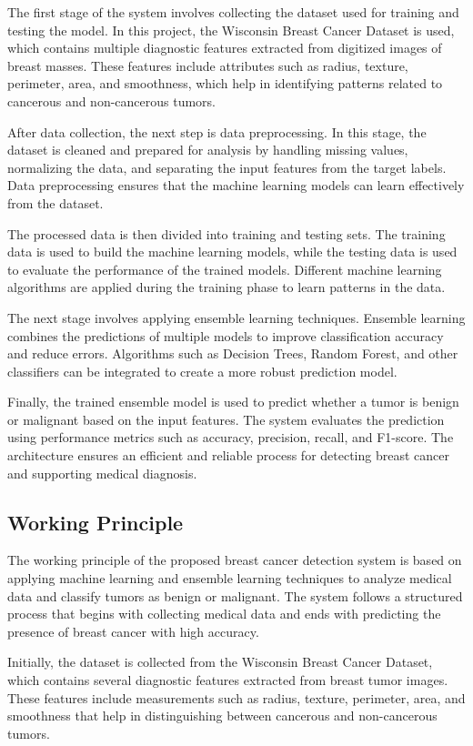\documentclass[12pt]{article}
\begin{document}
The first stage of the system involves collecting the dataset used for training and testing the model. In this project, the Wisconsin Breast Cancer Dataset is used, which contains multiple diagnostic features extracted from digitized images of breast masses. These features include attributes such as radius, texture, perimeter, area, and smoothness, which help in identifying patterns related to cancerous and non-cancerous tumors.

After data collection, the next step is data preprocessing. In this stage, the dataset is cleaned and prepared for analysis by handling missing values, normalizing the data, and separating the input features from the target labels. Data preprocessing ensures that the machine learning models can learn effectively from the dataset.

The processed data is then divided into training and testing sets. The training data is used to build the machine learning models, while the testing data is used to evaluate the performance of the trained models. Different machine learning algorithms are applied during the training phase to learn patterns in the data.

The next stage involves applying ensemble learning techniques. Ensemble learning combines the predictions of multiple models to improve classification accuracy and reduce errors. Algorithms such as Decision Trees, Random Forest, and other classifiers can be integrated to create a more robust prediction model.

Finally, the trained ensemble model is used to predict whether a tumor is benign or malignant based on the input features. The system evaluates the prediction using performance metrics such as accuracy, precision, recall, and F1-score. The architecture ensures an efficient and reliable process for detecting breast cancer and supporting medical diagnosis.

\subsection{Working Principle}

The working principle of the proposed breast cancer detection system is based on applying machine learning and ensemble learning techniques to analyze medical data and classify tumors as benign or malignant. The system follows a structured process that begins with collecting medical data and ends with predicting the presence of breast cancer with high accuracy.

Initially, the dataset is collected from the Wisconsin Breast Cancer Dataset, which contains several diagnostic features extracted from breast tumor images. These features include measurements such as radius, texture, perimeter, area, and smoothness that help in distinguishing between cancerous and non-cancerous tumors.
\end{document}
